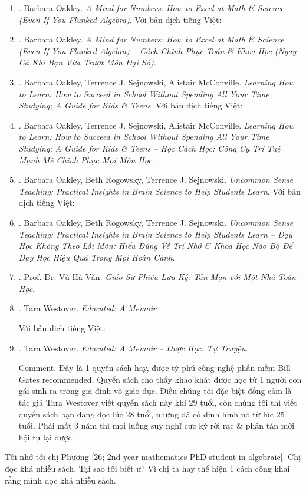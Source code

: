 \documentclass[12pt,twoside]{book}
\begin{document}
\begin{enumerate}
	{\sf Comment.} 1 quyển sách mà các bạn học sinh trường chuyên, đặc biệt là các bạn nằm trong đội tuyển thi học sinh giỏi các cấp nên tìm đọc.
	\item \cite{Oakley_mind_number}. {\sc Barbara Oakley}. {\it A Mind for Numbers: How to Excel at Math \& Science (Even If You Flunked Algebra)}. Với bản dịch tiếng Việt:
	\item \cite{Oakley_mind_number_VN}. {\sc Barbara Oakley}. {\it A Mind for Numbers: How to Excel at Math \& Science (Even If You Flunked Algebra) -- Cách Chinh Phục Toán \& Khoa Học (Ngay Cả Khi Bạn Vừa Trượt Môn Đại Số)}.
	\item \cite{Oakley_Sejnowski_McConville_learn_how_learn}. {\sc Barbara Oakley, Terrence J. Sejnowski, Alistair McConville}. {\it Learning How to Learn: How to Succeed in School Without Spending All Your Time Studying; A Guide for Kids \& Teens}. Với bản dịch tiếng Việt:
	\item \cite{Oakley_Sejnowski_McConville_learn_how_learn_VN}. {\sc Barbara Oakley, Terrence J. Sejnowski, Alistair McConville}. {\it Learning How to Learn: How to Succeed in School Without Spending All Your Time Studying; A Guide for Kids \& Teens -- Học Cách Học: Công Cụ Trí Tuệ Mạnh Mẽ Chinh Phục Mọi Môn Học}.
	\item \cite{Oakley_Rogowsky_Sejnowski_McConville_uncommon_sense_teaching}. {\sc Barbara Oakley, Beth Rogowsky, Terrence J. Sejnowski}. {\it Uncommon Sense Teaching: Practical Insights in Brain Science to Help Students Learn}. Với bản dịch tiếng Việt:
	\item \cite{Oakley_Rogowsky_Sejnowski_McConville_uncommon_sense_teaching_VN}. {\sc Barbara Oakley, Beth Rogowsky, Terrence J. Sejnowski}. {\it Uncommon Sense Teaching: Practical Insights in Brain Science to Help Students Learn -- Dạy Học Không Theo Lối Mòn: Hiểu Đúng Về Trí Nhớ \& Khoa Học Não Bộ Để Dạy Học Hiệu Quả Trong Mọi Hoàn Cảnh}.
	\item \cite{VanVu2022}. Prof. Dr. {\sc Vũ Hà Văn}. {\it Giáo Sư Phiêu Lưu Ký: Tản Mạn với Một Nhà Toán Học}.
	\item \cite{Westover_educated}. {\sc Tara Westover}. {\it Educated: A Memoir}.
	
	Với bản dịch tiếng Việt:
	\item \cite{Westover_educated_VN}. {\sc Tara Westover}. {\it Educated: A Memoir -- Được Học: Tự Truyện}.
	
	{\sf Comment.} Đây là 1 quyển sách hay, được tỷ phú công nghệ phần mềm {\sc Bill Gates} recommended. Quyển sách cho thấy khao khát được học từ 1 người con gái sinh ra trong gia đình vô giáo dục. Điều chúng tôi đặc biệt đồng cảm là tác giả {\sc Tara Westover} viết quyển sách này khi 29 tuổi, còn chúng tôi thì viết quyển sách bạn đang đọc lúc 28 tuổi, nhưng đã cố định hình nó từ lúc 25 tuổi. Phải mất 3 năm thì mọi luồng suy nghĩ cực kỳ rời rạc \& phân tán mới hội tụ lại được.
\end{enumerate}
Tôi nhớ tới chị {\sf Phương [26; 2nd-year mathematics PhD student in algebraic]}. Chị đọc khá nhiều sách. Tại sao tôi biết ư? Vì chị ta hay thể hiện 1 cách công khai rằng mình đọc khá nhiều sách.
\end{document}
